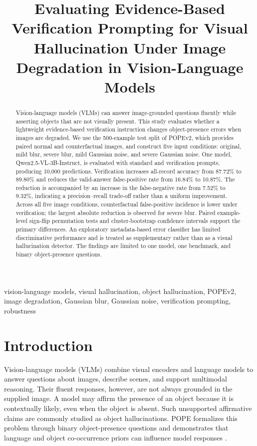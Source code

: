 \documentclass[conference]{IEEEtran}
\title{Evaluating Evidence-Based Verification Prompting for Visual Hallucination Under Image Degradation in Vision-Language Models}
\author{\IEEEauthorblockN{Akshat Sajwal, Sameer Mishra, Rakshit Kumar Jha, Ananya Gupta, and Ayush }
\IEEEauthorblockA{School of Computer Science\\
University of Petroleum and Energy Studies (UPES), Dehradun, India}}
\begin{document}
\maketitle

\begin{abstract}
Vision-language models (VLMs) can answer image-grounded questions fluently while asserting objects that are not visually present. This study evaluates whether a lightweight evidence-based verification instruction changes object-presence errors when images are degraded. We use the 500-example test split of POPEv2, which provides paired normal and counterfactual images, and construct five input conditions: original, mild blur, severe blur, mild Gaussian noise, and severe Gaussian noise. One model, Qwen2.5-VL-3B-Instruct, is evaluated with standard and verification prompts, producing 10,000 predictions. Verification increases all-record accuracy from 87.72\% to 89.80\% and reduces the valid-answer false-positive rate from 16.84\% to 10.87\%. The reduction is accompanied by an increase in the false-negative rate from 7.52\% to 9.32\%, indicating a precision--recall trade-off rather than a uniform improvement. Across all five image conditions, counterfactual false-positive incidence is lower under verification; the largest absolute reduction is observed for severe blur. Paired example-level sign-flip permutation tests and cluster-bootstrap confidence intervals support the primary differences. An exploratory metadata-based error classifier has limited discriminative performance and is treated as supplementary rather than as a visual hallucination detector. The findings are limited to one model, one benchmark, and binary object-presence questions.
\end{abstract}

\begin{IEEEkeywords}
vision-language models, visual hallucination, object hallucination, POPEv2, image degradation, Gaussian blur, Gaussian noise, verification prompting, robustness
\end{IEEEkeywords}

\section{Introduction}
Vision-language models (VLMs) combine visual encoders and language models to answer questions about images, describe scenes, and support multimodal reasoning. Their fluent responses, however, are not always grounded in the supplied image. A model may affirm the presence of an object because it is contextually likely, even when the object is absent. Such unsupported affirmative claims are commonly studied as object hallucinations. POPE formalizes this problem through binary object-presence questions and demonstrates that language and object co-occurrence priors can influence model responses \cite{li2023pope}.
\end{document}
